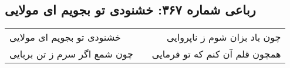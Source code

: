 \begin{center}
\section*{رباعی شماره ۳۶۷: خشنودی تو بجویم ای مولایی}
\label{sec:sh367}
\begin{longtable}{l p{0.5cm} r}
خشنودی تو بجویم ای مولایی
&&
چون باد بزان شوم ز ناپروایی
\\
چون شمع اگر سرم ز تن بربایی
&&
همچون قلم آن کنم که تو فرمایی
\\
\end{longtable}
\end{center}
